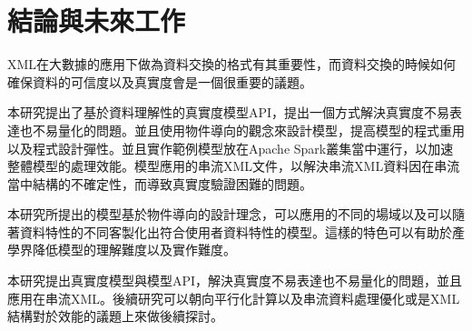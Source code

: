 \section{結論與未來工作}

XML在大數據的應用下做為資料交換的格式有其重要性，而資料交換的時候如何確保資料的可信度以及真實度會是一個很重要的議題。\\\par
本研究提出了基於資料理解性的真實度模型API，提出一個方式解決真實度不易表達也不易量化的問題。並且使用物件導向的觀念來設計模型，提高模型的程式重用以及程式設計彈性。並且實作範例模型放在Apache Spark叢集當中運行，以加速整體模型的處理效能。模型應用的串流XML文件，以解決串流XML資料因在串流當中結構的不確定性，而導致真實度驗證困難的問題。\\\par
本研究所提出的模型基於物件導向的設計理念，可以應用的不同的場域以及可以隨著資料特性的不同客製化出符合使用者資料特性的模型。這樣的特色可以有助於產學界降低模型的理解難度以及實作難度。\\\par

本研究提出真實度模型與模型API，解決真實度不易表達也不易量化的問題，並且應用在串流XML。後續研究可以朝向平行化計算以及串流資料處理優化或是XML結構對於效能的議題上來做後續探討。